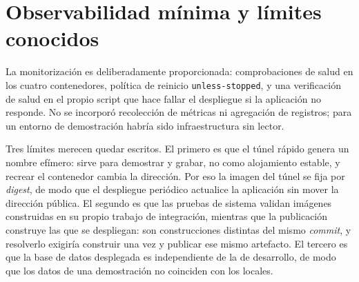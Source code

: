 \section{Observabilidad mínima y límites conocidos}

La monitorización es deliberadamente proporcionada: comprobaciones de salud en los cuatro contenedores, política de reinicio \texttt{unless-stopped}, y una verificación de salud en el propio script que hace fallar el despliegue si la aplicación no responde. No se incorporó recolección de métricas ni agregación de registros; para un entorno de demostración habría sido infraestructura sin lector.

Tres límites merecen quedar escritos. El primero es que el túnel rápido genera un nombre efímero: sirve para demostrar y grabar, no como alojamiento estable, y recrear el contenedor cambia la dirección. Por eso la imagen del túnel se fija por \emph{digest}, de modo que el despliegue periódico actualice la aplicación sin mover la dirección pública. El segundo es que las pruebas de sistema validan imágenes construidas en su propio trabajo de integración, mientras que la publicación construye las que se despliegan: son construcciones distintas del mismo \emph{commit}, y resolverlo exigiría construir una vez y publicar ese mismo artefacto. El tercero es que la base de datos desplegada es independiente de la de desarrollo, de modo que los datos de una demostración no coinciden con los locales.
